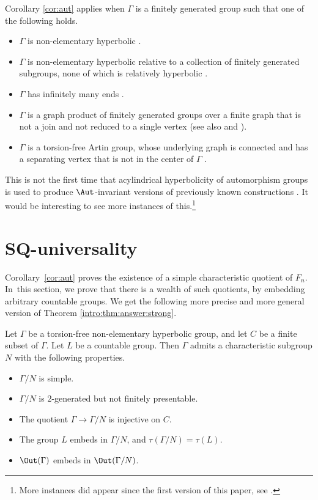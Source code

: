 \begin{example}
\label{ex:list}
Corollary \ref{cor:aut} applies when $\Gamma$ is a finitely generated group such that one of the following holds.
\begin{itemize}
\item $\Gamma$ is non-elementary hyperbolic \cite{auto:oneend, auto:infend}.
\item $\Gamma$ is non-elementary hyperbolic relative to a collection of finitely generated subgroups, none of which is relatively hyperbolic \cite[Th.\,1.3]{auto:infend}.
\item $\Gamma$ has infinitely many ends \cite[Th.\,1.1]{auto:infend}.
\item $\Gamma$ is a graph product of finitely generated groups over a finite graph that is not a join and not reduced to a single vertex \cite[Th.\,A.27]{escalierhorbez} (see also \cite[Th.\,E]{auto:graph1} and \cite[Th.\,1.5]{auto:graph2}).
\item $\Gamma$ is a torsion-free Artin group, whose underlying graph is connected and has a separating vertex that is not in the center of $\Gamma$ \cite[Th.\,E]{auto:artin}.
\end{itemize}
This is not the first time that acylindrical hyperbolicity of automorphism groups is used to produce $\Aut$-invariant versions of previously known constructions \cite{osin:aut, ffw}. It would be interesting to see more instances of this.\footnote{More instances did appear since the first version of this paper, see \cite{fff:separable, rinfty}.}
\end{example}

\section{SQ-universality}

Corollary~\ref{cor:aut} proves the existence of a simple characteristic quotient of $F_n$. In~this section, we prove that there is a wealth of such quotients, by embedding arbitrary countable groups. We get the following more precise and more general version of Theorem \ref{intro:thm:answer:strong}.

\begin{theorem}
\label{thm:answer}
Let $\Gamma$ be a torsion-free non-elementary hyperbolic group, and let $C$ be a finite subset of $\Gamma$.
Let $L$ be a countable group.
Then $\Gamma$ admits a characteristic subgroup $N$ with the following properties.
\begin{itemize}
\item $\Gamma / N$ is simple.
\item $\Gamma / N$ is $2$-generated but not finitely presentable.
\item The quotient $\Gamma \to \Gamma / N$ is injective on $C$.
\item The group $L$ embeds in $\Gamma / N$, and $\tau(\Gamma / N) = \tau(L)$.
\item $\Out(\Gamma)$ embeds in $\Out(\Gamma / N)$.
\end{itemize}
\end{theorem}

